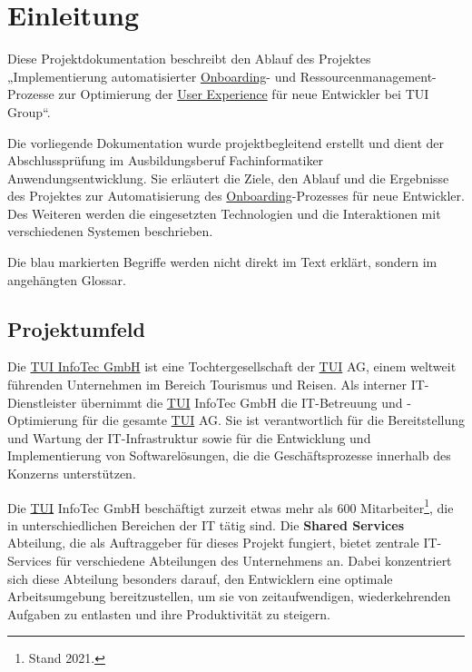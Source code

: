 \section{Einleitung}
\label{sec:Einleitung}

Diese Projektdokumentation beschreibt den Ablauf des Projektes „Implementierung automatisierter \hyperlink{Onboarding}{\textcolor{AOBlau}{Onboarding}}- und Ressourcenmanagement-Prozesse zur Optimierung der \hyperlink{UserExperience}{\textcolor{AOBlau}{User Experience}} für neue Entwickler bei \ac{TUI} Group“. 

Die vorliegende Dokumentation wurde projektbegleitend erstellt und dient der Abschlussprüfung im Ausbildungsberuf Fachinformatiker Anwendungsentwicklung. Sie erläutert die Ziele, den Ablauf und die Ergebnisse des Projektes zur Automatisierung des \hyperlink{Onboarding}{\textcolor{AOBlau}{Onboarding}}-Prozesses für neue Entwickler. Des Weiteren werden die eingesetzten Technologien und die Interaktionen mit verschiedenen Systemen beschrieben. 

Die \textcolor{AOBlau}{blau} markierten Begriffe werden nicht direkt im Text erklärt, sondern im angehängten Glossar.

\subsection{Projektumfeld} 
\label{sec:Projektumfeld}

Die \hyperlink{TUI}{\textcolor{AOBlau}{TUI} InfoTec GmbH} ist eine Tochtergesellschaft der \hyperlink{TUI}{\textcolor{AOBlau}{TUI}} AG, einem weltweit führenden Unternehmen im Bereich Tourismus und Reisen. Als interner IT-Dienstleister übernimmt die \hyperlink{TUI}{\textcolor{AOBlau}{TUI}} InfoTec GmbH die IT-Betreuung und -Optimierung für die gesamte \hyperlink{TUI}{\textcolor{AOBlau}{TUI}} AG. Sie ist verantwortlich für die Bereitstellung und Wartung der IT-Infrastruktur sowie für die Entwicklung und Implementierung von Softwarelösungen, die die Geschäftsprozesse innerhalb des Konzerns unterstützen.

Die \hyperlink{TUI}{\textcolor{AOBlau}{TUI}} InfoTec GmbH beschäftigt zurzeit etwas mehr als 600 Mitarbeiter\footnote{Stand 2021.}, die in unterschiedlichen Bereichen der IT tätig sind. Die \textbf{Shared Services} Abteilung, die als Auftraggeber für dieses Projekt fungiert, bietet zentrale IT-Services für verschiedene Abteilungen des Unternehmens an. Dabei konzentriert sich diese Abteilung besonders darauf, den Entwicklern eine optimale Arbeitsumgebung bereitzustellen, um sie von zeitaufwendigen, wiederkehrenden Aufgaben zu entlasten und ihre Produktivität zu steigern.

